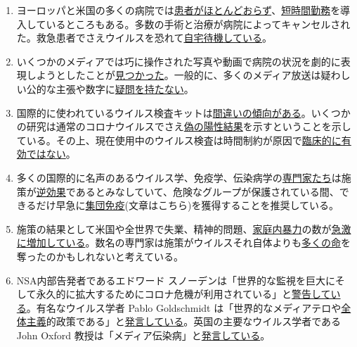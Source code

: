 \begin{enumerate}
\item
  ヨーロッパと米国の多くの病院では\href{https://www.spiegel.de/wirtschaft/unternehmen/trotz-corona-pandemie-warum-kliniken-jetzt-kurzarbeit-anmelden-a-3dc61bc9-fb12-4298-8022-bb4c2be39d7d}{患者がほとんどおらず}、\href{https://www.20min.ch/schweiz/news/story/Spitaeler-28949526}{短時間勤務}を導入しているところもある。多数の手術と治療が病院によってキャンセルされた。救急患者でさえウイルスを恐れて\href{https://www.youtube.com/watch?v=KucqjgM0P1E}{自宅待機している}。
\item
  いくつかのメディアでは巧に操作された写真や動画で病院の状況を劇的に表現しようとしたことが\href{https://nypost.com/2020/04/01/cbs-admits-to-using-footage-from-italy-in-report-about-nyc/}{見つかった}。一般的に、多くのメディア放送は疑わしい公的な主張や数字に\href{https://swprs.org/corona-media-propaganda/}{疑問を持たない}。
\item
  国際的に使われているウイルス検査キットは\href{https://www.ncbi.nlm.nih.gov/pubmed/32219885}{間違いの傾向がある}。いくつかの研究は通常のコロナウイルスでさえ\href{https://www.ncbi.nlm.nih.gov/pmc/articles/PMC2095096/}{偽の陽性結果}を示すということを示している。その上、現在使用中のウイルス検査は時間制約が原因で\href{https://www.youtube.com/watch?v=p_AyuhbnPOI}{臨床的に有効ではない}。
\item
  多くの国際的に名声のあるウイルス学、免疫学、伝染病学の\href{https://off-guardian.org/2020/03/24/12-experts-questioning-the-coronavirus-panic/}{専門家たち}は施策が\href{https://off-guardian.org/2020/03/28/10-more-experts-criticising-the-coronavirus-panic/}{逆効果}であるとみなしていて、危険なグループが保護されている間、できるだけ早急に\href{https://off-guardian.org/2020/04/08/watch-perspectives-on-the-pandemic-2/}{集団免疫}(文章はこちら)を獲得することを推奨している。
\item
  施策の結果として米国や全世界で失業、精神的問題、\href{http://d.hatena.ne.jp/keyword/\%B2\%C8\%C4\%ED\%C6\%E2\%CB\%BD\%CE\%CF}{家庭内暴力}の数が\href{https://www.reuters.com/article/us-health-coronavirus-usa-layoffs/us-weekly-jobless-claims-seen-at-record-high-again-idUSKBN21K0FX}{急激に増加している}。数名の専門家は施策がウイルスそれ自体よりも\href{https://www.nytimes.com/2020/03/20/opinion/coronavirus-pandemic-social-distancing.html}{多くの命}を奪ったのかもしれないと考えている。
\item
  NSA内部告発者であるエドワード
  スノーデンは「世界的な監視を巨大にそして永久的に拡大するためにコロナ危機が利用されている」と\href{https://www.youtube.com/watch?v=-pcQFTzck_c}{警告している}。有名なウイルス学者
  Pablo Goldschmidt
  は「世界的なメディアテロや\href{http://d.hatena.ne.jp/keyword/\%C1\%B4\%C2\%CE\%BC\%E7\%B5\%C1}{全体主義}的政策である」と\href{https://www.rubikon.news/artikel/der-corona-totalitarismus}{発言している}。英国の主要なウイルス学者である
  John Oxford
  教授は「メディア伝染病」と\href{https://novuscomms.com/2020/03/31/a-view-from-the-hvivo-open-orphan-orph-laboratory-professor-john-oxford/}{発言している}。
\end{enumerate}

